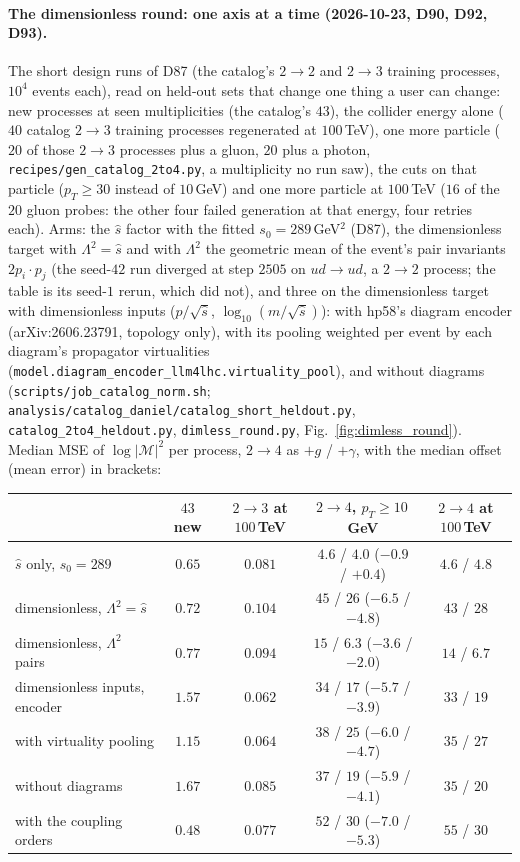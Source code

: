 \documentclass[11pt]{article}
\newcommand{\code}[1]{\texttt{#1}}
\begin{document}
\paragraph{The dimensionless round: one axis at a time (2026-10-23, D90, D92, D93).} The short design runs of D87 (the
catalog's $2\to2$ and $2\to3$ training processes, $10^4$ events each), read on held-out sets that change one thing a user
can change: new processes at seen multiplicities (the catalog's $43$), the collider energy alone ($40$ catalog $2\to3$
training processes regenerated at $100$\,TeV), one more particle ($20$ of those $2\to3$ processes plus a gluon, $20$ plus a
photon, \code{recipes/gen\_catalog\_2to4.py}, a multiplicity no run saw), the cuts on that particle ($p_T\geq30$ instead of
$10$\,GeV) and one more particle at $100$\,TeV ($16$ of the $20$ gluon probes: the other four failed generation at that
energy, four retries each). Arms: the $\hat s$ factor with the fitted $s_0=289$\,GeV$^2$ (D87), the dimensionless target
with $\Lambda^2=\hat s$ and with $\Lambda^2$ the geometric mean of the event's pair invariants $2p_i\cdot p_j$ (the seed-$42$
run diverged at step $2505$ on $ud\to ud$, a $2\to2$ process; the table is its seed-$1$ rerun, which did not), and three on
the dimensionless target with dimensionless inputs ($p/\sqrt{\hat s}$, $\log_{10}(m/\sqrt{\hat s})$): with hp58's diagram
encoder (arXiv:2606.23791, topology only), with its pooling weighted per event by each diagram's propagator virtualities
(\code{model.diagram\_encoder\_llm4lhc.virtuality\_pool}), and without diagrams
(\code{scripts/job\_catalog\_norm.sh}; \code{analysis/catalog\_daniel/catalog\_short\_heldout.py},
\code{catalog\_2to4\_heldout.py}, \code{dimless\_round.py}, Fig.~\ref{fig:dimless_round}). Median MSE of
$\log|\mathcal M|^2$ per process, $2\to4$ as $+g$ / $+\gamma$, with the median offset (mean error) in brackets:
\begin{center}
\begin{tabular}{lcccc}
 & $43$ new & $2\to3$ at $100$\,TeV & $2\to4$, $p_T\geq10$\,GeV & $2\to4$ at $100$\,TeV \\ \hline
$\hat s$ only, $s_0=289$ & $0.65$ & $0.081$ & $4.6$ / $4.0$ ($-0.9$ / $+0.4$) & $4.6$ / $4.8$ \\
dimensionless, $\Lambda^2=\hat s$ & $0.72$ & $0.104$ & $45$ / $26$ ($-6.5$ / $-4.8$) & $43$ / $28$ \\
dimensionless, $\Lambda^2$ pairs & $0.77$ & $0.094$ & $15$ / $6.3$ ($-3.6$ / $-2.0$) & $14$ / $6.7$ \\
dimensionless inputs, encoder & $1.57$ & $0.062$ & $34$ / $17$ ($-5.7$ / $-3.9$) & $33$ / $19$ \\
\quad with virtuality pooling & $1.15$ & $0.064$ & $38$ / $25$ ($-6.0$ / $-4.7$) & $35$ / $27$ \\
\quad without diagrams & $1.67$ & $0.085$ & $37$ / $19$ ($-5.9$ / $-4.1$) & $35$ / $20$ \\
\quad with the coupling orders & $0.48$ & $0.077$ & $52$ / $30$ ($-7.0$ / $-5.3$) & $55$ / $30$ \\
\end{tabular}
\end{center}
\end{document}
